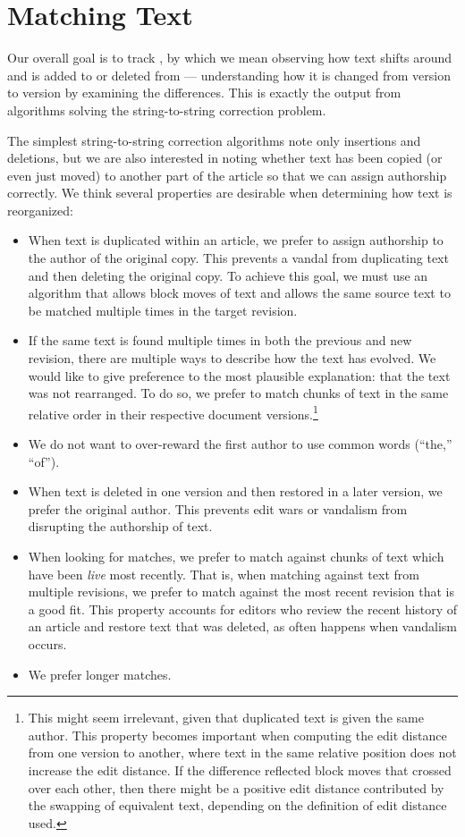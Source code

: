 \section{Matching Text}
\label{sec:diff-greedy}

Our overall goal is to track ,
by which we mean observing how text shifts
around and is added to or deleted from ---
understanding how it is changed from version to version
by examining the differences.
This is exactly the output from algorithms solving the
string-to-string correction problem.

The simplest string-to-string correction algorithms
note only insertions and deletions, but we are also interested
in noting whether text has been copied (or even just moved)
to another part of the article so that we can assign authorship
correctly.
We think several properties are desirable
when determining how text is reorganized:
\begin{itemize}
\item When text is duplicated within an article, we prefer to assign
    authorship to the author of the original copy.
    This prevents a vandal from duplicating text and then deleting the
    original copy.
    To achieve this goal, we must use an algorithm that allows
    block moves of text and allows the same source text to be
    matched multiple times in the target revision.
\item If the same text is found multiple times in both the previous
    and new revision, there are multiple ways to describe how the
    text has evolved.
    We would like to give preference to the most plausible explanation:
    that the text was not rearranged.
    To do so, we prefer to match chunks of text in the
    same relative order in their respective document
    versions.\footnote{This might seem irrelevant, given that duplicated
    text is given the same author.  This property becomes important
    when computing the edit distance from one version to another,
    where text in the same relative position does not increase the
    edit distance.  If the difference reflected block moves that
    crossed over each other, then there might be a positive edit
    distance contributed by the swapping of equivalent text,
    depending on the definition of edit distance used.}
\item We do not want to over-reward the first author to use common
    words (\eg ``the,'' ``of'').
\item When text is deleted in one version and then restored in a later
    version, we prefer the original author.
    This prevents edit wars or vandalism from disrupting the
    authorship of text.
\item When looking for matches, we prefer to match against chunks
    of text which have been \textit{live} most recently.
    That is, when matching against text from multiple revisions,
    we prefer to match against the most recent revision that is
    a good fit.
    This property accounts for editors who review the recent history
    of an article and restore text that was deleted, as often happens
    when vandalism occurs.
\item We prefer longer matches.
\end{itemize}


